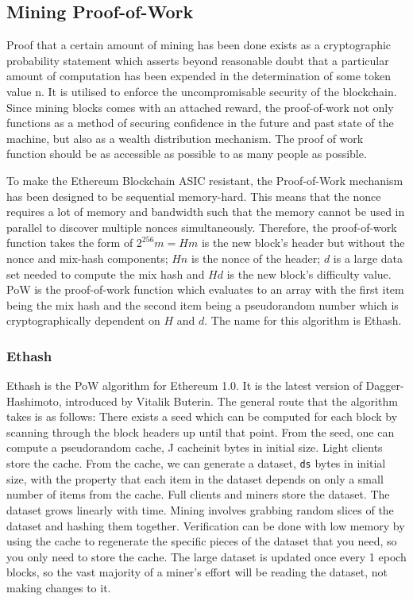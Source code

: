 \documentclass[10pt,a4paper,leqno,bibliography=totoc]{scrartcl}
\newenvironment{alphafootnotes}
{\par\edef\savedfootnotenumber{\number\value{footnote}}
\renewcommand{\thefootnote}{\alph{footnote}}
\setcounter{footnote}{0}}
{\par\setcounter{footnote}{\savedfootnotenumber}}
\begin{document}
\begin{alphafootnotes}
\begin{multicols*}{2}
		
		\subsection{Mining Proof-of-Work} Proof that a certain amount of mining has been done exists as a cryptographic probability statement which asserts beyond reasonable doubt that a particular amount of computation has been expended in the determination of some token value n. It is utilised to enforce the uncompromisable security of the blockchain. Since mining blocks comes with an attached reward, the proof-of-work not only functions as a method of securing confidence in the future and past state of the machine, but also as a wealth distribution mechanism. The proof of work function should be as accessible as possible to as many people as possible. 

		To make the Ethereum Blockchain ASIC resistant, the Proof-of-Work mechanism has been designed to be  sequential memory-hard. This means that the nonce requires a lot of memory and bandwidth such that the memory cannot be used in parallel to discover multiple nonces simultaneously. Therefore, the proof-of-work function takes the form of $2^256m = Hm$ is the new block’s header but without the nonce and mix-hash components; $Hn$ is the nonce of the header; $d$ is a large data set needed to compute the mix hash and $H d$ is the new block’s difficulty value. PoW is the proof-of-work function which evaluates to an array with the first item being the mix hash and the second item being a pseudorandom number which is cryptographically dependent on $H$ and $d$. The name for this algorithm is Ethash. 
		\subsubsection{Ethash}	
		Ethash is the PoW algorithm for Ethereum 1.0. It is the latest version of Dagger-Hashimoto, introduced by Vitalik Buterin. The general route that the algorithm takes is as follows: There exists a seed which can be computed for each block by scanning through the block headers up until that point. From the seed, one can compute a pseudorandom cache, J cacheinit bytes in initial size. Light clients store the cache. From the cache, we can generate a dataset, \texttt{ds} bytes in initial size, with the property that each item in the dataset depends on only a small number of items from the cache. Full clients and miners store the dataset. The dataset grows linearly with time. Mining involves grabbing random slices of the dataset and hashing them together. Verification can be done with low memory by using the cache to regenerate the specific pieces of the dataset that you need, so you only need to store the cache. The large dataset is updated once every 1 epoch blocks, so the vast majority of a miner’s effort will be reading the dataset, not making changes to it.  

\end{multicols*}
\end{alphafootnotes}
\end{document}
